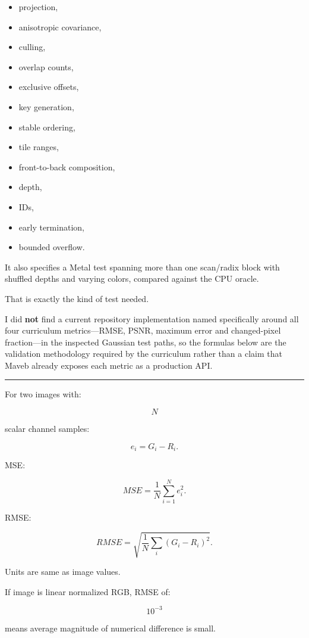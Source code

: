 \begin{itemize}
\tightlist
\item
  projection,
\item
  anisotropic covariance,
\item
  culling,
\item
  overlap counts,
\item
  exclusive offsets,
\item
  key generation,
\item
  stable ordering,
\item
  tile ranges,
\item
  front-to-back composition,
\item
  depth,
\item
  IDs,
\item
  early termination,
\item
  bounded overflow.
\end{itemize}

It also specifies a Metal test spanning more than one scan/radix block with shuffled depths and varying colors, compared against the CPU oracle.

That is exactly the kind of test needed.

I did \textbf{not} find a current repository implementation named specifically around all four curriculum metrics---RMSE, PSNR, maximum error and changed-pixel fraction---in the inspected Gaussian test paths, so the formulas below are the validation methodology required by the curriculum rather than a claim that Maveb already exposes each metric as a production API.

\begin{center}\rule{0.5\linewidth}{0.5pt}\end{center}

For two images with:

\[
N
\]

scalar channel samples:

\[
e_i=
G_i-R_i.
\]

MSE:

\[
\boxed{
MSE=
\frac1N
\sum_{i=1}^{N}
e_i^2.
}
\]

RMSE:

\[
\boxed{
RMSE=
\sqrt{
\frac1N
\sum_i
(G_i-R_i)^2
}.
}
\]

Units are same as image values.

If image is linear normalized RGB, RMSE of:

\[
10^{-3}
\]

means average magnitude of numerical difference is small.

